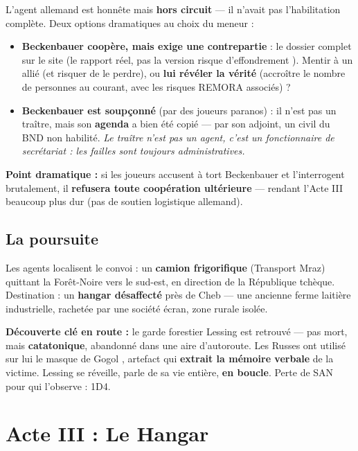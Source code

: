 \documentclass[10pt,a5paper,twoside]{book}
\begin{document}
\begin{shaded}
L'agent allemand est honnête mais \textbf{hors circuit} --- il n'avait pas l'habilitation complète. Deux options dramatiques au choix du meneur :
\begin{itemize}
	\item \textbf{Beckenbauer coopère, mais exige une contrepartie} : le dossier complet sur le site (le rapport réel, pas la version \og risque d'effondrement \fg). Mentir à un allié (et risquer de le perdre), ou \textbf{lui révéler la vérité} (accroître le nombre de personnes au courant, avec les risques REMORA associés) ?
	\item \textbf{Beckenbauer est soupçonné} (par des joueurs paranos) : il n'est pas un traître, mais son \textbf{agenda} a bien été copié --- par son adjoint, un civil du BND non habilité. \emph{Le traître n'est pas un agent, c'est un fonctionnaire de secrétariat : les failles sont toujours administratives.}
	\end{itemize}
\textbf{Point dramatique :} si les joueurs accusent à tort Beckenbauer et l'interrogent brutalement, il \textbf{refusera toute coopération ultérieure} --- rendant l'Acte III beaucoup plus dur (pas de soutien logistique allemand).
\end{shaded}

\subsection{La poursuite}

Les agents localisent le convoi : un \textbf{camion frigorifique} (Transport Mraz) quittant la Forêt-Noire vers le sud-est, en direction de la République tchèque. Destination : un \textbf{hangar désaffecté} près de Cheb --- une ancienne ferme laitière industrielle, rachetée par une société écran, zone rurale isolée.

\begin{shaded}
\textbf{Découverte clé en route :} le garde forestier Lessing est retrouvé --- pas mort, mais \textbf{catatonique}, abandonné dans une aire d'autoroute. Les Russes ont utilisé sur lui le \og masque de Gogol \fg, artefact qui \textbf{extrait la mémoire verbale} de la victime. Lessing se réveille, parle de sa vie entière, \textbf{en boucle}. Perte de SAN pour qui l'observe : 1D4.
\end{shaded}

\clearpage

\section{Acte III : Le Hangar}
\end{document}
